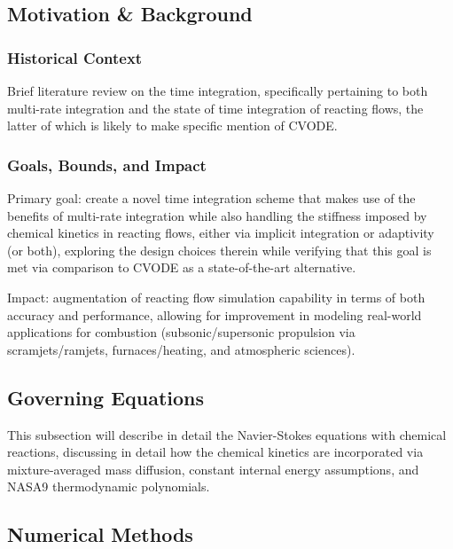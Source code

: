 \subsection{Motivation \& Background}

\subsubsection{Historical Context}

Brief literature review on the time integration, specifically
pertaining to both multi-rate integration and the state of time
integration of reacting flows, the latter of which is likely to
make specific mention of CVODE.

\subsubsection{Goals, Bounds, and Impact}

Primary goal: create a novel time integration scheme that makes
use of the benefits of multi-rate integration while also handling
the stiffness imposed by chemical kinetics in reacting flows, either
via implicit integration or adaptivity (or both), exploring the
design choices therein while verifying that this goal is met via
comparison to CVODE as a state-of-the-art alternative.

Impact: augmentation of reacting flow simulation capability in terms
of both accuracy and performance, allowing for improvement in modeling
real-world applications for combustion (subsonic/supersonic propulsion
via scramjets/ramjets, furnaces/heating, and atmospheric sciences).

\subsection{Governing Equations}

This subsection will describe in detail the Navier-Stokes equations with
chemical reactions, discussing in detail how the chemical kinetics are
incorporated via mixture-averaged mass diffusion, constant internal energy
assumptions, and NASA9 thermodynamic polynomials.

\subsection{Numerical Methods}

